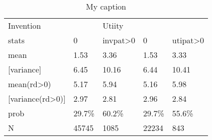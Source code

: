 \begin{table}[]
\centering
\caption{My caption}
\label{my-label}
\begin{tabular}{lllll}
Invention                       &        & Utiity              &        &                     \\
stats                           & 0      & invpat\textgreater0 & 0      & utipat\textgreater0 \\
mean                            & 1.53   & 3.36                & 1.53   & 3.33                \\
{[}variance{]}                  & 6.45   & 10.16               & 6.44   & 10.41               \\
mean(rd\textgreater0)           & 5.17   & 5.94                & 5.16   & 5.98                \\
{[}variance(rd\textgreater0){]} & 2.97   & 2.81                & 2.96   & 2.84                \\
prob                            & 29.7\% & 60.2\%              & 29.7\% & 55.6\%              \\
N                               & 45745  & 1085                & 22234  & 843                
\end{tabular}
\end{table}